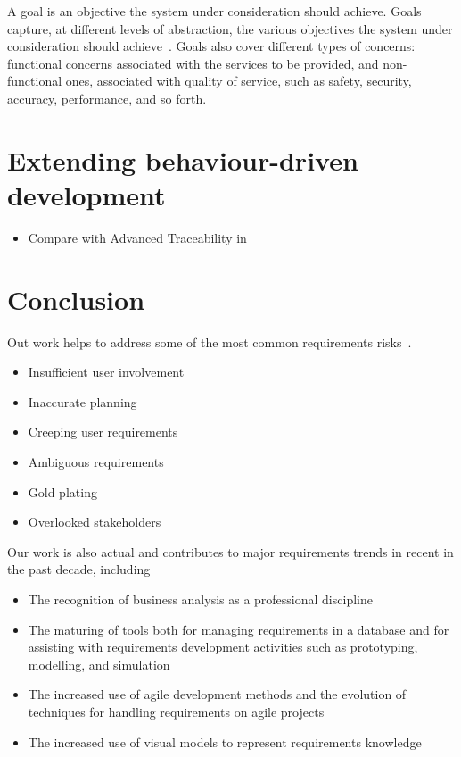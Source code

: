 \documentclass[dissertation,final]{softeng}
\begin{document}
A goal is an objective the system under consideration should achieve. Goals capture, at different levels of abstraction, the various objectives the system under consideration should achieve~\citep{Lamsweerde:2001wpba}. Goals also cover different types of concerns: functional concerns associated with the services to be provided, and non-functional ones, associated with quality of service, such as safety, security, accuracy, performance, and so forth.

\pagebreak

\chapter{Extending behaviour-driven development}
\label{ch:Extendingbdd}

\begin{itemize}
\item Compare with Advanced Traceability in~\citep{Hull2011}
\end{itemize}


\chapter{Conclusion}
\label{ch:Conclusion}
Out work helps to address some of the most common requirements risks~\citep[p. 20]{Wiegers2013}.
\begin{itemize}
\item Insufficient user involvement
\item Inaccurate planning
\item Creeping user requirements
\item Ambiguous requirements
\item Gold plating
\item Overlooked stakeholders
\end{itemize}
\appendix
Our work is also actual and contributes to major requirements trends in recent in the past decade, including
\begin{itemize}
\item The recognition of business analysis as a professional discipline
\item The maturing of tools both for managing requirements in a database and for assisting with requirements development activities such as prototyping, modelling, and simulation
\item The increased use of agile development methods and the evolution of techniques for handling requirements on agile projects
\item The increased use of visual models to represent requirements knowledge
\end{itemize}
\end{document}
